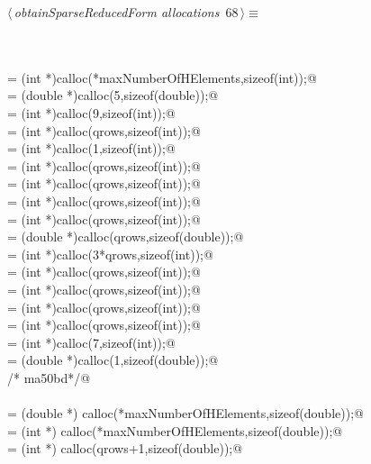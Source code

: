 \documentclass{article}
\begin{document}
\begin{flushleft} \small
\begin{minipage}{\linewidth}\label{scrap105}\raggedright\small
{} $\langle\,${\itshape obtainSparseReducedForm allocations}\nobreak\ {\footnotesize {68}}$\,\rangle\equiv$
\vspace{-1ex}
\begin{list}{}{} \item
\mbox{}\verb@@\\
\mbox{}\verb@@\\
\mbox{}\verb@jcn = (int *)calloc(*maxNumberOfHElements,sizeof(int));@\\
\mbox{}\verb@cntl= (double *)calloc(5,sizeof(double));@\\
\mbox{}\verb@icntl= (int *)calloc(9,sizeof(int));@\\
\mbox{}\verb@ip = (int *)calloc(qrows,sizeof(int));@\\
\mbox{}\verb@np = (int *)calloc(1,sizeof(int));@\\
\mbox{}\verb@jfirst = (int *)calloc(qrows,sizeof(int));@\\
\mbox{}\verb@lenr = (int *)calloc(qrows,sizeof(int));@\\
\mbox{}\verb@lastr = (int *)calloc(qrows,sizeof(int));@\\
\mbox{}\verb@nextr = (int *)calloc(qrows,sizeof(int));@\\
\mbox{}\verb@w = (double *)calloc(qrows,sizeof(double));@\\
\mbox{}\verb@iw = (int *)calloc(3*qrows,sizeof(int));@\\
\mbox{}\verb@ifirst = (int *)calloc(qrows,sizeof(int));@\\
\mbox{}\verb@lenc = (int *)calloc(qrows,sizeof(int));@\\
\mbox{}\verb@lastc = (int *)calloc(qrows,sizeof(int));@\\
\mbox{}\verb@nextc = (int *)calloc(qrows,sizeof(int));@\\
\mbox{}\verb@info = (int *)calloc(7,sizeof(int));@\\
\mbox{}\verb@rinfo = (double *)calloc(1,sizeof(double));@\\
\mbox{}\verb@/* ma50bd*/@\\
\mbox{}\verb@@\\
\mbox{}\verb@qrmat = (double *) calloc(*maxNumberOfHElements,sizeof(double));@\\
\mbox{}\verb@qrmatj = (int *) calloc(*maxNumberOfHElements,sizeof(double));@\\
\mbox{}\verb@qrmati = (int *) calloc(qrows+1,sizeof(double));@\\

\end{list}
\end{minipage}
\end{flushleft}
\end{document}
